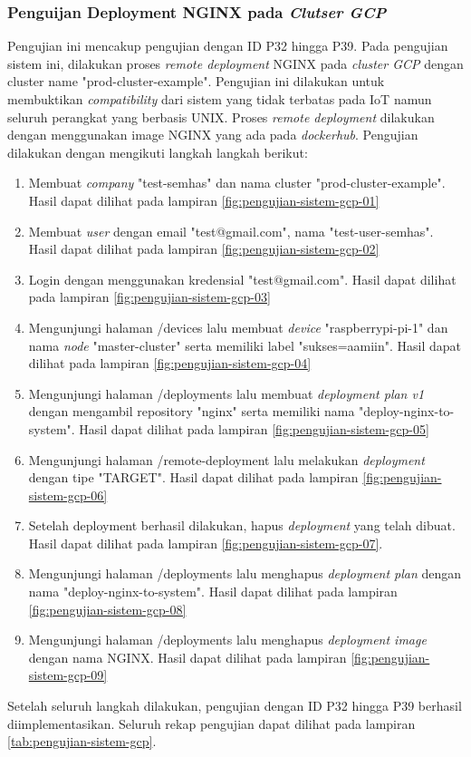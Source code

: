 \subsubsection{Penguijan Deployment NGINX pada \textit{Clutser GCP}}

Pengujian ini mencakup pengujian dengan ID P32 hingga P39. Pada pengujian sistem ini, dilakukan proses \textit{remote deployment} NGINX pada \textit{cluster GCP} dengan cluster name "prod-cluster-example". Pengujian ini dilakukan untuk membuktikan \textit{compatibility} dari sistem yang tidak terbatas pada IoT namun seluruh perangkat yang berbasis UNIX. Proses \textit{remote deployment} dilakukan dengan menggunakan image NGINX yang ada pada \textit{dockerhub}. Pengujian dilakukan dengan mengikuti langkah langkah berikut:

\begin{enumerate}
  \item Membuat \textit{company} "test-semhas" dan nama cluster "prod-cluster-example". Hasil dapat dilihat pada lampiran \ref{fig:pengujian-sistem-gcp-01}
  \item Membuat \textit{user} dengan email "test@gmail.com", nama "test-user-semhas". Hasil dapat dilihat pada lampiran \ref{fig:pengujian-sistem-gcp-02}
  \item Login dengan menggunakan kredensial "test@gmail.com". Hasil dapat dilihat pada lampiran \ref{fig:pengujian-sistem-gcp-03}
  \item Mengunjungi halaman /devices lalu membuat \textit{device} "raspberrypi-pi-1" dan nama \textit{node} "master-cluster" serta memiliki label "sukses=aamiin". Hasil dapat dilihat pada lampiran \ref{fig:pengujian-sistem-gcp-04}
  \item Mengunjungi halaman /deployments lalu membuat \textit{deployment plan v1} dengan mengambil repository "nginx" serta memiliki nama "deploy-nginx-to-system". Hasil dapat dilihat pada lampiran \ref{fig:pengujian-sistem-gcp-05}
  \item Mengunjungi halaman /remote-deployment lalu melakukan \textit{deployment} dengan tipe "TARGET". Hasil dapat dilihat pada lampiran \ref{fig:pengujian-sistem-gcp-06}
  \item Setelah deployment berhasil dilakukan, hapus \textit{deployment} yang telah dibuat. Hasil dapat dilihat pada lampiran \ref{fig:pengujian-sistem-gcp-07}.
  \item Mengunjungi halaman /deployments lalu menghapus \textit{deployment plan} dengan nama "deploy-nginx-to-system". Hasil dapat dilihat pada lampiran \ref{fig:pengujian-sistem-gcp-08}
  \item Mengunjungi halaman /deployments lalu menghapus \textit{deployment image} dengan nama NGINX. Hasil dapat dilihat pada lampiran \ref{fig:pengujian-sistem-gcp-09}
\end{enumerate}

Setelah seluruh langkah dilakukan, pengujian dengan ID P32 hingga P39 berhasil diimplementasikan. Seluruh rekap pengujian dapat dilihat pada lampiran \ref{tab:pengujian-sistem-gcp}.